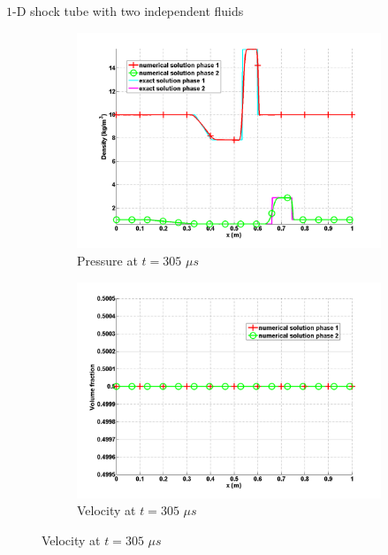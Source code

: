 \documentclass[xcolor=dvipsnames,10pt]{beamer}
\begin{document}
\begin{frame}{$1$-D shock tube with two independent fluids}
\begin{figure}
        \begin{subfigure}[b]{0.37\textwidth}
                \centering
                \includegraphics[width=\textwidth]{../figures/SEM/two_phases_density.png}
                \caption{Pressure at $t=305$ $\mu s$}
        \end{subfigure}%
        \begin{subfigure}[b]{0.37\textwidth}
                \centering
                \includegraphics[width=\textwidth]{../figures/SEM/two_phases_volume_fraction.png}
                \caption{Velocity at $t=305$ $\mu s$}
        \end{subfigure}%
\end{figure}
\end{frame}
\end{document}
